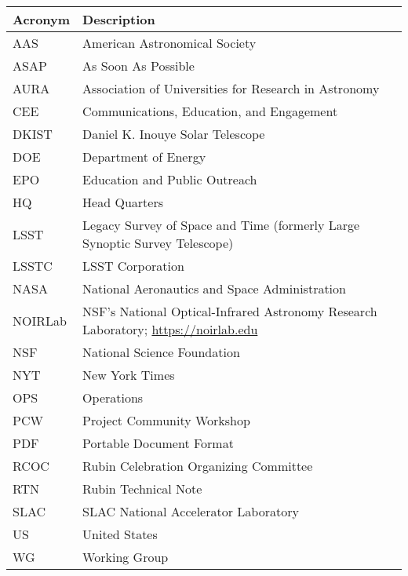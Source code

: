 \addtocounter{table}{-1}
\begin{longtable}{p{}p{}}\hline
\textbf{Acronym} & \textbf{Description}  \\\hline

AAS & American Astronomical Society \\\hline
ASAP & As Soon As Possible \\\hline
AURA & Association of Universities for Research in Astronomy \\\hline
CEE & Communications, Education, and Engagement \\\hline
DKIST & Daniel K. Inouye Solar Telescope \\\hline
DOE & Department of Energy \\\hline
EPO & Education and Public Outreach \\\hline
HQ & Head Quarters \\\hline
LSST & Legacy Survey of Space and Time (formerly Large Synoptic Survey Telescope) \\\hline
LSSTC & LSST Corporation \\\hline
NASA & National Aeronautics and Space Administration \\\hline
NOIRLab & NSF's National Optical-Infrared Astronomy Research Laboratory; \url{https://noirlab.edu} \\\hline
NSF & National Science Foundation \\\hline
NYT & New York Times \\\hline
OPS & Operations \\\hline
PCW & Project Community Workshop \\\hline
PDF & Portable Document Format \\\hline
RCOC & Rubin Celebration Organizing Committee \\\hline
RTN & Rubin Technical Note \\\hline
SLAC & SLAC National Accelerator Laboratory \\\hline
US & United States \\\hline
WG & Working Group \\\hline
\end{longtable}

